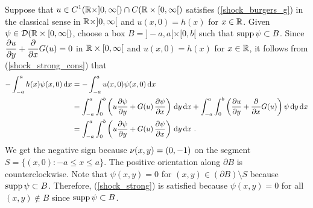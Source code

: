 Suppose that
$\displaystyle u \in C^1(\RR \times ]0,\infty[) \cap C(\RR \times [0,\infty[)$
satisfies (\ref{shock_burgers_g}) in the classical
sense in $\RR \times ]0,\infty[$ and $u(x,0) = h(x)$ for $x \in \RR$.
Given $\psi \in \DD(\RR \times [0,\infty[)$,
choose a box $B = ]-a,a[\times[0,b[$ such that $\supp \psi \subset B$.
Since $\displaystyle \pdydx{u}{y} + \pdfdx{G(u)}{x} = 0$ in
$\RR\times [0,\infty[$ and $u(x,0) = h(x)$ for $x\in \RR$, it follows
from (\ref{shock_strong_cons}) that
\begin{align*}
-\int_{-a}^a h(x)\psi(x,0) \dx{x} &= -\int_{-a}^a u(x,0)\psi(x,0) \dx{x} \\
&= \int_{-a}^a \int_0^b
\left( u \pdydx{\psi}{y} + G(u)\,\pdydx{\psi}{x} \right) \dx{y}\dx{x}
+ \int_{-a}^a \int_0^b  \left( \pdydx{u}{y} + \pdfdx{G(u)}{x}\right)
\psi \dx{y}\dx{x} \\
&= \int_{-a}^a \int_0^b
\left( u \pdydx{\psi}{y} + G(u)\,\pdydx{\psi}{x} \right) \dx{y}\dx{x} \ .
\end{align*}
We get the negative sign because $\VEC{\nu}(x,y) = (0,-1)$ on the segment
$S = \{(x,0) : -a \leq x \leq a\}$.  The positive orientation along
$\partial B$ is counterclockwise.  Note that
$\psi(x,y) = 0$ for $(x,y) \in (\partial B) \setminus S$
because $\supp \psi \subset B$.
Therefore, (\ref{shock_strong}) is satisfied because
$\psi(x,y) = 0$ for all $(x,y)\not\in B$ since $\supp \psi \subset B$.

